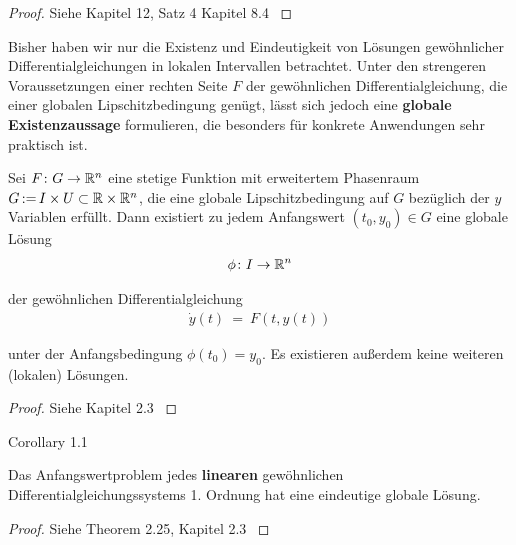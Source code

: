 \begin{proof}
 Siehe Kapitel 12, Satz 4 Kapitel 8.4 \cite{For17}
\end{proof}

\par
Bisher haben wir nur die Existenz und Eindeutigkeit von Lösungen gewöhnlicher Differentialgleichungen in lokalen Intervallen betrachtet.
Unter den strengeren Voraussetzungen einer rechten Seite \(F\) der gewöhnlichen Differentialgleichung, die einer globalen Lipschitzbedingung genügt, lässt sich jedoch eine \textbf{globale Existenzaussage} formulieren, die besonders für konkrete Anwendungen sehr praktisch ist.
\label{ode/repetition:satz:picardlindeloef}
\begin{theorem}{}{}



\par
Sei \(F\colon G\to\mathbb{R}^n\) eine stetige Funktion mit erweitertem Phasenraum \(G \, {:=} \, I \times U \subset \mathbb{R}\times\mathbb{R}^n\), die eine globale Lipschitzbedingung auf \(G\) bezüglich der \(y\) Variablen erfüllt.
Dann existiert zu jedem Anfangswert \((t_0,y_0) \in G\) eine globale Lösung
\begin{align*}
\phi \colon I \to \mathbb{R}^n
\end{align*}
\par
der gewöhnlichen Differentialgleichung
\begin{align*}
\dot{y}(t) \ = \ F(t,y(t))
\end{align*}
\par
unter der Anfangsbedingung \(\phi(t_0)=y_0\).
Es existieren außerdem keine weiteren (lokalen) Lösungen.
\end{theorem}

\begin{proof}
 Siehe Kapitel 2.3 \cite{Kna13}
\end{proof}
\label{ode/repetition:cor:eindeutigkeit_linear}
\begin{emphBox}{}{}{Corollary 1.1}



\par
Das Anfangswertproblem jedes \textbf{linearen} gewöhnlichen Differentialgleichungssystems 1. Ordnung hat eine eindeutige globale Lösung.
\end{emphBox}

\begin{proof}
 Siehe Theorem 2.25, Kapitel 2.3 \cite{Kna13}
\end{proof}


